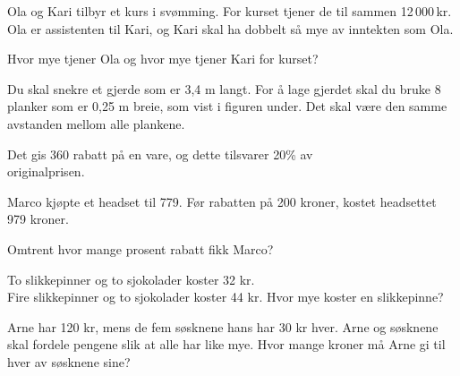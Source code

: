 




\opgt

Ola og Kari tilbyr et kurs i svømming. For kurset tjener de til sammen 12\,000\,kr. Ola er assistenten til Kari, og Kari skal ha dobbelt så mye av inntekten som Ola. \os

Hvor mye tjener Ola og hvor mye tjener Kari for kurset?

Du skal snekre et gjerde som er 3,4 m langt. For å lage gjerdet skal du bruke 8 planker som er 0,25 m breie, som vist i figuren under. Det skal være den samme avstanden mellom alle plankene. 

 \vs
{}

 \vs
{}
\newpage
{}
Det gis 360 rabatt på en vare, og dette tilsvarer 20\% av \\ originalprisen.

Marco kjøpte et headset til 779. Før rabatten på 200 kroner, kostet headsettet 979 kroner.\os

Omtrent hvor mange prosent rabatt fikk Marco?

To slikkepinner og to sjokolader koster 32 kr.\\
Fire slikkepinner og to sjokolader koster 44 kr.\os
Hvor mye koster en slikkepinne?


\newpage


Arne har 120 kr, mens de fem søsknene hans har 30 kr hver. Arne og søsknene skal fordele pengene slik at alle har like mye. Hvor mange kroner må Arne gi til hver av søsknene sine?

